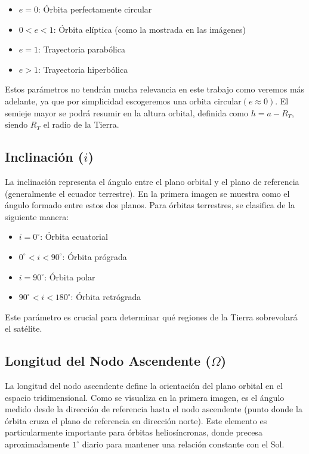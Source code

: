 \begin{itemize}
    \item \( e = 0 \): Órbita perfectamente circular
    \item \( 0 < e < 1 \): Órbita elíptica (como la mostrada en las imágenes)
    \item \( e = 1 \): Trayectoria parabólica
    \item \( e > 1 \): Trayectoria hiperbólica
\end{itemize}

\noindent Estos parámetros no tendrán mucha relevancia en este trabajo como veremos más adelante, ya que por simplicidad escogeremos una orbita circular$(e\approx0)$. El semieje mayor se podrá resumir en la altura orbital,
definida como $h= a- R_T$, siendo $R_T$ el radio de la Tierra.

\subsection{Inclinación ($i$)}

La inclinación representa el ángulo entre el plano orbital y el plano de referencia (generalmente el ecuador terrestre). En la primera imagen se muestra como el ángulo formado entre estos dos planos. Para órbitas terrestres, se clasifica de la siguiente manera:

\begin{itemize}
  \item $i = 0^\circ$: Órbita ecuatorial
  \item $0^\circ < i < 90^\circ$: Órbita prógrada
  \item $i = 90^\circ$: Órbita polar
  \item $90^\circ < i < 180^\circ$: Órbita retrógrada
\end{itemize}

Este parámetro es crucial para determinar qué regiones de la Tierra sobrevolará el satélite.

\subsection{Longitud del Nodo Ascendente ($\Omega$)}

La longitud del nodo ascendente define la orientación del plano orbital en el espacio tridimensional. Como se visualiza en la primera imagen, es el ángulo medido desde la dirección de referencia hasta el nodo ascendente (punto donde la órbita cruza el plano de referencia en dirección norte). Este elemento es particularmente importante para órbitas heliosíncronas, donde precesa aproximadamente $1^\circ$ diario para mantener una relación constante con el Sol.

